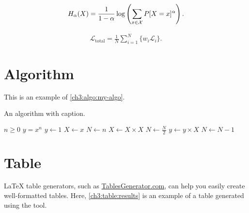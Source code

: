 \begin{equation}
\label{ch3:eq:renyi}
H_{\alpha}(X) =
\frac{1}{1-\alpha}
\log \left(\sum_{x \in {\cal X}}P[X=x]^{\alpha} \right) .
\end{equation}

\begin{equation}
\label{ch3:eq:total-loss}
\begin{aligned}
\mathcal{L}_{\textrm{total}} = \frac{1}{N}\sum_{i=1}^{N}\{w_i\mathcal{L}_i\}.
\end{aligned}
\end{equation}

\section{Algorithm}
\begin{paragraph}
This is an example of \autoref{ch3:algo:my-algo}.
\end{paragraph}

\begin{algorithm}[h]
\caption{An algorithm with caption.}
\label{ch3:algo:my-algo}
\normalsize\singlespacing
\begin{algorithmic}[1] %
    \Require $n \geq 0$
    \Ensure $y = x^n$
    \State $y \gets 1$
    \State $X \gets x$
    \State $N \gets n$
            \State $X \gets X \times X$
            \State $N \gets \frac{N}{2}$ 
            \State $y \gets y \times X$
            \State $N \gets N - 1$
        \EndIf
    \EndWhile
\end{algorithmic}
\end{algorithm}

\section{Table}
\begin{paragraph}
LaTeX table generators, such as \href{https://www.tablesgenerator.com/}{TablesGenerator.com}\footnotemark{}, can help you easily create well-formatted tables.
Here, \autoref{ch3:table:results} is an example of a table generated using the tool.
\end{paragraph}

